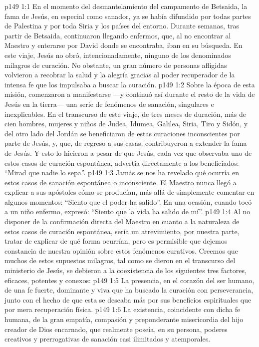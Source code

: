 \vs p149 1:1 En el momento del desmantelamiento del campamento de Betsaida, la fama de Jesús, en especial como sanador, ya se había difundido por todas partes de Palestina y por toda Siria y los países del entorno. Durante semanas, tras partir de Betsaida, continuaron llegando enfermos, que, al no encontrar al Maestro y enterarse por David donde se encontraba, iban en su búsqueda. En este viaje, Jesús no obró, intencionadamente, ninguno de los denominados milagros de curación. No obstante, un gran número de personas afligidas volvieron a recobrar la salud y la alegría gracias al poder recuperador de la intensa fe que los impulsaba a buscar la curación.
\vs p149 1:2 Sobre la época de esta misión, comenzaron a manifestarse ---y continuó así durante el resto de la vida de Jesús en la tierra--- una serie de fenómenos de sanación, singulares e inexplicables. En el transcurso de este viaje, de tres meses de duración, más de cien hombres, mujeres y niños de Judea, Idumea, Galilea, Siria, Tiro y Sidón, y del otro lado del Jordán se beneficiaron de estas curaciones inconscientes por parte de Jesús, y, que, de regreso a sus casas, contribuyeron a extender la fama de Jesús. Y esto lo hicieron a pesar de que Jesús, cada vez que observaba uno de estos casos de curación espontánea, advertía directamente a los beneficiados: “Mirad que nadie lo sepa”.
\vs p149 1:3 \pc Jamás se nos ha revelado qué ocurría en estos casos de sanación espontánea o inconsciente. El Maestro nunca llegó a explicar a sus apóstoles cómo se producían, más allá de simplemente comentar en algunos momentos: “Siento que el poder ha salido”. En una ocasión, cuando tocó a un niño enfermo, expresó: “Siento que la vida ha salido de mí”.
\vs p149 1:4 Al no disponer de la confirmación directa del Maestro en cuanto a la naturaleza de estos casos de curación espontánea, sería un atrevimiento, por nuestra parte, tratar de explicar de qué forma ocurrían, pero es permisible que dejemos constancia de nuestra opinión sobre estos fenómenos curativos. Creemos que muchos de estos supuestos milagros, tal como se dieron en el transcurso del ministerio de Jesús, se debieron a la coexistencia de los siguientes tres factores, eficaces, potentes y conexos:
\vs p149 1:5 La presencia, en el corazón del ser humano, de una fe fuerte, dominante y viva que ha buscado la curación con perseverancia, junto con el hecho de que esta se deseaba más por sus beneficios espirituales que por mera recuperación física.
\vs p149 1:6 La existencia, coincidente con dicha fe humana, de la gran empatía, compasión y preponderante misericordia del hijo creador de Dios encarnado, que realmente poseía, en su persona, poderes creativos y prerrogativas de sanación casi ilimitados y atemporales.
